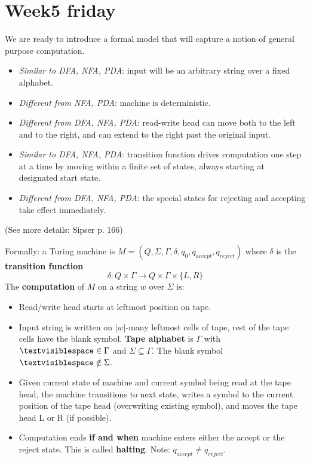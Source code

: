 \documentclass[12pt, oneside]{article}
\begin{document}
 \vfill
\section*{Week5 friday}


We are ready to introduce a formal model that will capture a notion of general purpose computation.
\begin{itemize}
\item {\it Similar to DFA, NFA, PDA}: input will be an arbitrary string over a fixed alphabet.
\item {\it Different from NFA, PDA}: machine is deterministic.
\item {\it Different from DFA, NFA, PDA}: read-write head can move both to the left and to the right,
and can extend to the right past the original input.
\item {\it Similar to DFA, NFA, PDA}: transition function drives computation one step at a time 
by moving within a finite set of states, always starting at designated start state.
\item {\it Different from DFA, NFA, PDA}: the special states for rejecting and accepting take effect immediately.
\end{itemize}

\vspace{-10pt}

(See more details: Sipser p. 166)

\vfill

Formally: a  Turing machine is $M= (Q, \Sigma, \Gamma, \delta, q_0, q_{accept}, q_{reject})$ 
where $\delta$ is the {\bf transition function} 
\[
  \delta: Q\times \Gamma \to Q \times \Gamma \times \{L, R\}
\]
The {\bf computation} of $M$ on a string $w$ over $\Sigma$  is:

\vspace{-10pt}

\begin{itemize}
\setlength{\itemsep}{0pt}
\item Read/write head starts at leftmost position on tape. 
\item Input string is written on $|w|$-many leftmost cells of tape, 
rest of  the tape cells have  the blank symbol. {\bf Tape alphabet} 
is $\Gamma$ with $\textvisiblespace\in \Gamma$ and $\Sigma \subseteq \Gamma$.
The blank symbol $\textvisiblespace \notin \Sigma$.
\item Given current state of machine and current symbol being read at the tape head, 
the machine transitions to next state, writes a symbol to the current position  of the 
tape  head (overwriting existing symbol), and moves the tape head L or R (if possible). 
\item Computation ends {\bf if and when} machine enters either the accept or the reject state.
This is called {\bf halting}.
Note: $q_{accept} \neq q_{reject}$.
\end{itemize}
\end{document}
